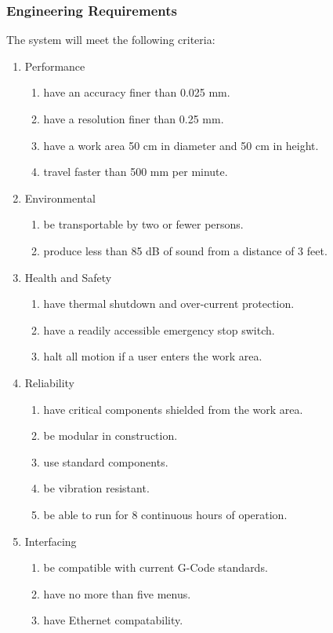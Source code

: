 \documentclass[11pt]{report}
\begin{document}
\newpage
\subsubsection{Engineering Requirements}
The system will meet the following criteria:
\begin{enumerate} \parskip2pt
	\item Performance
	\begin{enumerate}
		\item have an accuracy finer than 0.025 mm.
		\item have a resolution finer than 0.25 mm.
		\item have a work area 50 cm in diameter and 50 cm in height.
		\item travel faster than 500 mm per minute.
	\end{enumerate}

	\item Environmental
	\begin{enumerate}
		\item be transportable by two or fewer persons.
		\item produce less than 85 dB of sound from a distance of 3 feet.
	\end{enumerate}

	\item Health and Safety
	\begin{enumerate}
		\item have thermal shutdown and over-current protection.
		\item have a readily accessible emergency stop switch.
		\item halt all motion if a user enters the work area.
	\end{enumerate}

	\item Reliability
	\begin{enumerate}
		\item have critical components shielded from the work area.
		\item be modular in construction.
		\item use standard components.
		\item be vibration resistant.
		\item be able to run for 8 continuous hours of operation.
	\end{enumerate}

	\item Interfacing
	\begin{enumerate}
		\item be compatible with current G-Code standards.
		\item have no more than five menus.
		\item have Ethernet compatability.
	\end{enumerate}
\end{enumerate}
\end{document}
